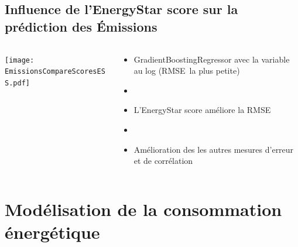 \documentclass[8pt,aspectratio=169,hyperref={unicode=true}]{beamer}
\begin{document}
\subsection{Influence de l'EnergyStar score sur la prédiction des Émissions}
\begin{frame}{\insertsubsection}
  \begin{columns}
    \begin{column}{.6\textwidth}
      \centering
      \texttt{[image: EmissionsCompareScoresESS.pdf]}
    \end{column}
    \begin{column}{.4\textwidth}
      \begin{itemize}
        \item GradientBoostingRegressor avec la variable au log (RMSE la plus petite)
        \item[]
        \item L'EnergyStar score améliore la RMSE
        \item[]
        \item Amélioration des les autres mesures d'erreur et de corrélation
      \end{itemize}
    \end{column}
  \end{columns}
\end{frame}

\section[Modélisation consommation]{Modélisation de la consommation énergétique}
\end{document}

